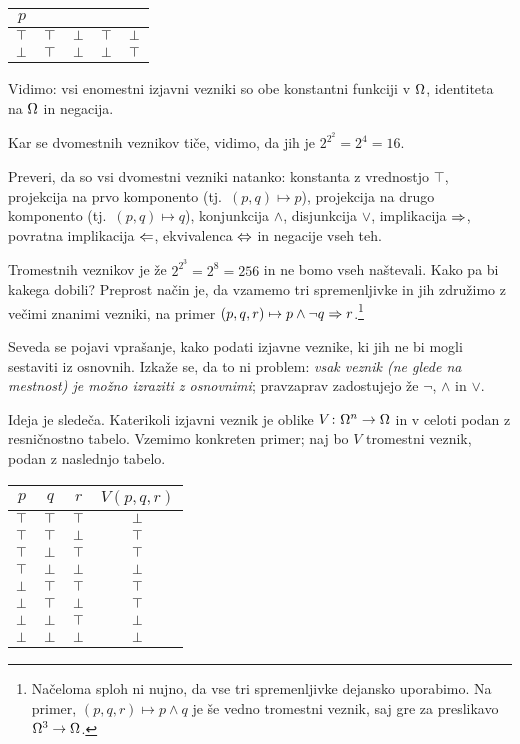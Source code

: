 		\begin{center}
			\begin{tabular}{c|cccc}
				$p$ &&&& \\
				\hline
				$\top$ & $\top$ & $\bot$ & $\top$ & $\bot$ \\
				$\bot$ & $\top$ & $\bot$ & $\bot$ & $\top$
			\end{tabular}
		\end{center}
		
		Vidimo: vsi enomestni izjavni vezniki so obe konstantni funkciji v $\Omega$, identiteta na $\Omega$ in negacija.
		
		Kar se dvomestnih veznikov tiče, vidimo, da jih je $2^{2^2} = 2^4 = 16$.
		
		\begin{vaja}
			Preveri, da so vsi dvomestni vezniki natanko: konstanta z vrednostjo $\top$, projekcija na prvo komponento (tj.~$(p, q) \mapsto p$), projekcija na drugo komponento (tj.~$(p, q) \mapsto q$), konjunkcija $\land$, disjunkcija $\lor$, implikacija $\Rightarrow$, povratna implikacija $\Leftarrow$, ekvivalenca $\Leftrightarrow$ in negacije vseh teh.
		\end{vaja}
		
		Tromestnih veznikov je že $2^{2^3} = 2^8 = 256$ in ne bomo vseh naštevali. Kako pa bi kakega dobili? Preprost način je, da vzamemo tri spremenljivke in jih združimo z večimi znanimi vezniki, na primer $(p, q, r) \mapsto p \land \lnot{q} \Rightarrow r$.\footnote{Načeloma sploh ni nujno, da vse tri spremenljivke dejansko uporabimo. Na primer, $(p, q, r) \mapsto p \land q$ je še vedno tromestni veznik, saj gre za preslikavo $\Omega^3 \to \Omega$.}
		
		Seveda se pojavi vprašanje, kako podati izjavne veznike, ki jih ne bi mogli sestaviti iz osnovnih. Izkaže se, da to ni problem: \emph{vsak veznik (ne glede na mestnost) je možno izraziti z osnovnimi}; pravzaprav zadostujejo že $\lnot$, $\land$ in $\lor$.
		
		Ideja je sledeča. Katerikoli izjavni veznik je oblike $V\colon \Omega^n \to \Omega$ in v celoti podan z resničnostno tabelo. Vzemimo konkreten primer; naj bo $V$ tromestni veznik, podan z naslednjo tabelo.
		
		\begin{center}
			\begin{tabular}{ccc|c}
				$p$ & $q$ & $r$ & $V(p, q, r)$ \\
				\hline
				$\top$ & $\top$ & $\top$ & $\bot$ \\
				$\top$ & $\top$ & $\bot$ & $\top$ \\
				$\top$ & $\bot$ & $\top$ & $\top$ \\
				$\top$ & $\bot$ & $\bot$ & $\bot$ \\
				$\bot$ & $\top$ & $\top$ & $\top$ \\
				$\bot$ & $\top$ & $\bot$ & $\top$ \\
				$\bot$ & $\bot$ & $\top$ & $\bot$ \\
				$\bot$ & $\bot$ & $\bot$ & $\bot$
			\end{tabular}
		\end{center}
		
